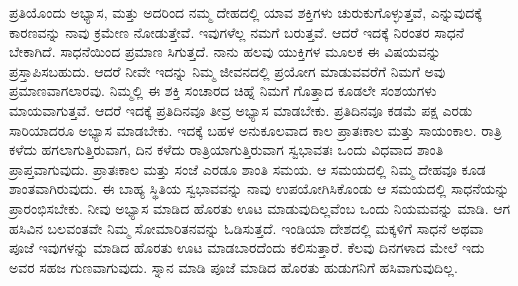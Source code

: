 \vskip 0.3cm

ಪ್ರತಿಯೊಂದು ಅಭ್ಯಾಸ, ಮತ್ತು ಅದರಿಂದ ನಮ್ಮ ದೇಹದಲ್ಲಿ ಯಾವ ಶಕ್ತಿಗಳು ಚುರುಕುಗೊಳ್ಳುತ್ತವೆ, ಎನ್ನುವುದಕ್ಕೆ ಕಾರಣವನ್ನು ನಾವು ಕ್ರಮೇಣ ನೋಡುತ್ತೇವೆ. ಇವುಗಳೆಲ್ಲ ನಮಗೆ ಬರುತ್ತವೆ. ಆದರೆ ಇದಕ್ಕೆ ನಿರಂತರ ಸಾಧನೆ ಬೇಕಾಗಿದೆ. ಸಾಧನೆಯಿಂದ ಪ್ರಮಾಣ ಸಿಗುತ್ತದೆ. ನಾನು ಹಲವು ಯುಕ್ತಿಗಳ ಮೂಲಕ ಈ ವಿಷಯವನ್ನು ಪ್ರಸ್ತಾಪಿಸಬಹುದು. ಆದರೆ ನೀವೇ ಇದನ್ನು ನಿಮ್ಮ ಜೀವನದಲ್ಲಿ ಪ್ರಯೋಗ ಮಾಡುವವರೆಗೆ ನಿಮಗೆ ಅವು ಪ್ರಮಾಣವಾಗಲಾರವು. ನಿಮ್ಮಲ್ಲಿ ಈ ಶಕ್ತಿ ಸಂಚಾರದ ಚಿಹ್ನೆ ನಿಮಗೆ ಗೊತ್ತಾದ ಕೂಡಲೇ ಸಂಶಯಗಳು ಮಾಯವಾಗುತ್ತವೆ. ಆದರೆ ಇದಕ್ಕೆ ಪ್ರತಿದಿನವೂ ತೀವ್ರ ಅಭ್ಯಾಸ ಮಾಡಬೇಕು. ಪ್ರತಿದಿನವೂ ಕಡಮೆ ಪಕ್ಷ ಎರಡು ಸಾರಿಯಾದರೂ ಅಭ್ಯಾಸ ಮಾಡಬೇಕು. ಇದಕ್ಕೆ ಬಹಳ ಅನುಕೂಲವಾದ ಕಾಲ ಪ್ರಾತಃಕಾಲ ಮತ್ತು ಸಾಯಂಕಾಲ. ರಾತ್ರಿ ಕಳೆದು ಹಗಲಾಗುತ್ತಿರುವಾಗ, ದಿನ ಕಳೆದು ರಾತ್ರಿಯಾಗುತ್ತಿರುವಾಗ ಸ್ವಭಾವತಃ ಒಂದು ವಿಧವಾದ ಶಾಂತಿ ಪ್ರಾಪ್ತವಾಗುವುದು. ಪ್ರಾತಃಕಾಲ ಮತ್ತು ಸಂಜೆ ಎರಡೂ ಶಾಂತಿ ಸಮಯ. ಆ ಸಮಯದಲ್ಲಿ ನಿಮ್ಮ ದೇಹವೂ ಕೂಡ ಶಾಂತವಾಗಿರುವುದು. ಈ ಬಾಹ್ಯ ಸ್ಥಿತಿಯ ಸ್ವಭಾವವನ್ನು ನಾವು ಉಪಯೋಗಿಸಿಕೊಂಡು ಆ ಸಮಯದಲ್ಲಿ ಸಾಧನೆಯನ್ನು ಪ್ರಾರಂಭಿಸಬೇಕು. ನೀವು ಅಭ್ಯಾಸ ಮಾಡಿದ ಹೊರತು ಊಟ ಮಾಡುವುದಿಲ್ಲವೆಂಬ ಒಂದು ನಿಯಮವನ್ನು ಮಾಡಿ. ಆಗ ಹಸಿವಿನ ಬಲವಂತವೇ ನಿಮ್ಮ ಸೋಮಾರಿತನವನ್ನು ಓಡಿಸುತ್ತದೆ. ಇಂಡಿಯಾ ದೇಶದಲ್ಲಿ ಮಕ್ಕಳಿಗೆ ಸಾಧನೆ ಅಥವಾ ಪೂಜೆ ಇವುಗಳನ್ನು ಮಾಡಿದ ಹೊರತು ಊಟ ಮಾಡಬಾರದೆಂದು ಕಲಿಸುತ್ತಾರೆ. ಕೆಲವು ದಿನಗಳಾದ ಮೇಲೆ ಇದು ಅವರ ಸಹಜ ಗುಣವಾಗುವುದು. ಸ್ನಾನ ಮಾಡಿ ಪೂಜೆ ಮಾಡಿದ ಹೊರತು ಹುಡುಗನಿಗೆ ಹಸಿವಾಗುವುದಿಲ್ಲ. 

\eject

